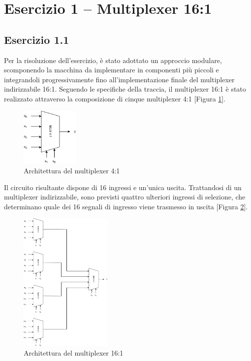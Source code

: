 \section{Esercizio 1 -- Multiplexer 16:1}
\subsection{Esercizio 1.1}
Per la risoluzione dell’esercizio, è stato adottato un approccio modulare, scomponendo la macchina da implementare in componenti più piccoli e integrandoli progressivamente fino all'implementazione finale del multiplexer indirizzabile 16:1. Seguendo le specifiche della traccia, il multiplexer 16:1 è stato realizzato attraverso la composizione di cinque multiplexer 4:1 [Figura \ref{fig:mux_4_1}].

\begin{figure}[h]
    \centering
    \includegraphics[width=0.25\textwidth]{img/mux_4_1.pdf}
    \caption{Architettura del multiplexer 4:1}
    \label{fig:mux_4_1}
\end{figure}

Il circuito risultante dispone di 16 ingressi e un’unica uscita. Trattandosi di un multiplexer indirizzabile, sono previsti quattro ulteriori ingressi di selezione, che determinano quale dei 16 segnali di ingresso viene trasmesso in uscita [Figura \ref{fig:mux_16_1}].

\begin{figure}[h]
    \centering
    \includegraphics[width=0.4\textwidth]{img/mux_16_1.pdf}
    \caption{Architettura del multiplexer 16:1}
    \label{fig:mux_16_1}
\end{figure}

